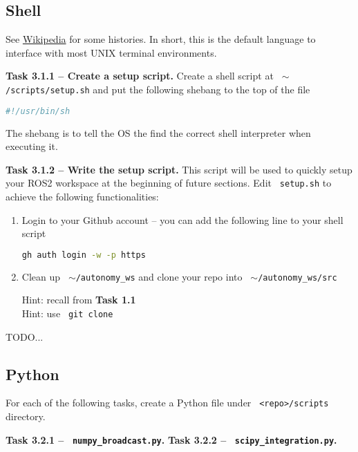 \documentclass{article}
\def\code#1{\texttt{\color{magenta} #1}}
\begin{document}
\subsection{Shell}
See \href{https://en.wikipedia.org/wiki/Shell_script}{Wikipedia} for some histories. In
short, this is the default language to interface with most UNIX terminal environments.

{\bf Task 3.1.1 -- Create a setup script.} Create a shell script at \code{$\sim$/scripts/setup.sh}
and put the following shebang to the top of the file
\begin{lstlisting}[language=sh, numbers=none]
#!/usr/bin/sh
\end{lstlisting}
The shebang is to tell the OS the find the correct shell interpreter when executing it.

{\bf Task 3.1.2 -- Write the setup script.} This script will be used to quickly setup
your ROS2 workspace at the beginning of future sections. Edit \code{setup.sh} to achieve
the following functionalities:

\begin{enumerate}
\item Login to your Github account -- you can add the following line to your shell script
\begin{lstlisting}[language=sh, numbers=none]
gh auth login -w -p https
\end{lstlisting}

\item Clean up \code{$\sim$/autonomy\_ws} and clone your repo into \code{$\sim$/autonomy\_ws/src}

  Hint: recall from {\bf Task 1.1}\\
  Hint: use \code{git clone}
\end{enumerate}

TODO...


\subsection{Python}
For each of the following tasks, create a Python file under \code{<repo>/scripts} directory.

{\bf Task 3.2.1 -- \code{numpy\_broadcast.py}.}
{\bf Task 3.2.2 -- \code{scipy\_integration.py}.}
\end{document}
